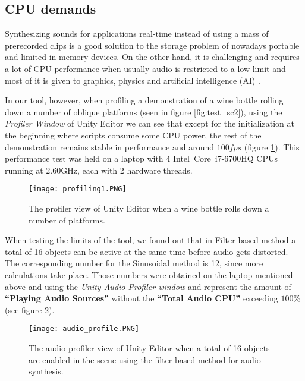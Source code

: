 \subsection{CPU demands}
Synthesizing sounds for applications real-time instead of using a mass of prerecorded clips is a good solution to the storage problem of nowadays portable and limited in memory devices. On the other hand, it is challenging and requires a lot of CPU performance when usually audio is restricted to a low limit and most of it is given to graphics, physics and artificial intelligence (AI) \cite{lloyd2011sound}. 

In our tool, however, when profiling a demonstration of a wine bottle rolling down a number of oblique platforms (seen in figure \ref{fig:test_sc2}), using the \textit{Profiler Window} of Unity Editor we can see that except for the initialization at the beginning where scripts consume some CPU power, the rest of the demonstration remains stable in performance and around $100 fps$ (figure \ref{fig:profile}). This performance test was held on a laptop with 4 Intel\textregistered\ Core\texttrademark\ i7-6700HQ CPUs running at 2.60GHz, each with 2 hardware threads.

\begin{figure}[H]
  \centering
    \texttt{[image: profiling1.PNG]}
      \caption{The profiler view of Unity Editor when a wine bottle rolls down a number of platforms.}
      \label{fig:profile}
\end{figure} 

When testing the limits of the tool, we found out that in Filter-based method a total of 16 objects can be active at the same time before audio gets distorted. The corresponding number for the Sinusoidal method is 12, since more calculations take place. Those numbers were obtained on the laptop mentioned above and using the \textit{Unity Audio Profiler window} and represent the amount of \textbf{``Playing Audio Sources''} without the \textbf{``Total Audio CPU''} exceeding $100\%$ (see figure \ref{fig:audio_profile}).

\begin{figure}[H]
  \centering
    \texttt{[image: audio\_profile.PNG]}
      \caption{The audio profiler view of Unity Editor when a total of 16 objects are enabled in the scene using the filter-based method for audio synthesis.}
      \label{fig:audio_profile}
\end{figure}


